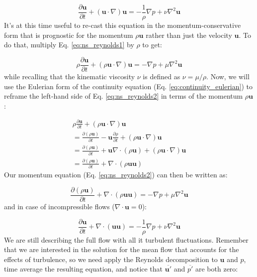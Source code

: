 \documentclass[12pt]{article}
\numberwithin{equation}{section}
\numberwithin{figure}{section}
\numberwithin{table}{section}
\begin{document}
\begin{equation}
  \frac{\partial \mathbf{u}}{\partial t} + (\mathbf{u} \cdot \nabla) \mathbf{u} =
  - \frac{1}{\rho} \nabla p + \nu \nabla^2 \mathbf{u}
  \label{eq:ns_reynolds1}
\end{equation}
It's at this time useful to re-cast this equation in the momentum-conservative
form that is prognostic for the momentum $\rho \mathbf{u}$ rather than just the
velocity $\mathbf{u}$.
To do that, multiply Eq. \ref{eq:ns_reynolds1} by $\rho$ to get:

\begin{equation}
  \rho \frac{\partial \mathbf{u}}{\partial t} + (\rho \mathbf{u} \cdot \nabla) \mathbf{u} =
  - \nabla p + \mu \nabla^2 \mathbf{u}
  \label{eq:ns_reynolds2}
\end{equation}
while recalling that the kinematic viscosity $\nu$ is defined as
$\nu = \mu / \rho$.
Now, we will use the Eulerian form of the continuity equation
(Eq. \ref{eq:continuity_eulerian}) to reframe the left-hand side of Eq.
\ref{eq:ns_reynolds2} in terms of the momentum $\rho \mathbf{u}$:

\begin{equation}
\begin{split}
  \rho \frac{\partial \mathbf{u}}{\partial t} + (\rho \mathbf{u} \cdot \nabla) \mathbf{u} \\
  = \frac{\partial (\rho \mathbf{u})}{\partial t} - \mathbf{u} \frac{\partial \rho}{\partial t} + (\rho \mathbf{u} \cdot \nabla) \mathbf{u} \\
  = \frac{\partial (\rho \mathbf{u})}{\partial t} + \mathbf{u} \nabla \cdot (\rho \mathbf{u}) + (\rho \mathbf{u} \cdot \nabla) \mathbf{u} \\
  = \frac{\partial (\rho \mathbf{u})}{\partial t} + \nabla \cdot (\rho \mathbf{u} \mathbf{u})
\end{split}
\end{equation}
Our momentum equation (Eq. \ref{eq:ns_reynolds2}) can then be written as:

\begin{equation}
  \frac{\partial (\rho \mathbf{u})}{\partial t} +
  \nabla \cdot (\rho \mathbf{u} \mathbf{u}) =
  - \nabla p + \mu \nabla^2 \mathbf{u}
\end{equation}
and in case of incompressible flows ($\nabla \cdot \mathbf{u} = 0$):

\begin{equation}
  \frac{\partial \mathbf{u}}{\partial t} +
  \nabla \cdot (\mathbf{u} \mathbf{u}) =
  - \frac{1}{\rho} \nabla p + \nu \nabla^2 \mathbf{u}
  \label{eq:ns_reynolds3}
\end{equation}
We are still describing the full flow with all it turbulent fluctuations.
Remember that we are interested in the solution for the mean flow that accounts
for the effects of turbulence, so we need apply the Reynolds decomposition to
$\mathbf{u}$ and $p$, time average the resulting equation, and notice that
$\overline{\mathbf{u}'}$ and $\overline{p'}$ are both zero:
\end{document}
